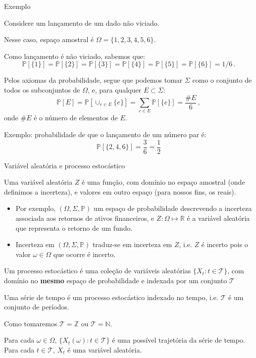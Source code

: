 \documentclass[11pt]{beamer}
\newenvironment{halfwideitemize}{\itemize\addtolength{\itemsep}{0.5em}}{\enditemize}
\begin{document}
	\begin{frame}{Exemplo}
		\begin{halfwideitemize}
			\item Considere um lançamento de um dado não viciado.
			\item Nesse caso, espaço amostral é $\Omega = \{1,2,3,4,5,6\}$.
			\item Como lançamento é não viciado, sabemos que:
			$$\mathbb{P}[\{1\}]= \mathbb{P}[\{2\}] = \mathbb{P}[\{3\}] = \mathbb{P}[\{4\}] = \mathbb{P}[\{5\}] = \mathbb{P}[\{6\}] = 1/6 \,.$$
			\item Pelos axiomas da probabilidade, segue que podemos tomar $\Sigma$ como o conjunto de todos os subconjuntos de $\Omega$, e, para qualquer $E\subset \Sigma$:
			$$\mathbb{P}[E]= \mathbb{P}[\cup_{e \in E}\{e\}] = \sum_{e \in E}\mathbb{P}[\{e\}] = \frac{\# E}{6}\, ,$$
			onde $\# E$ é o número de elementos de $E$.
			\item Exemplo: probabilidade de que o lançamento de um número par é:
			$$\mathbb{P}[\{2,4,6\}]= \frac{3}{6} = \frac{1}{2}$$
		\end{halfwideitemize}
	\end{frame}
	
	
	\begin{frame}{Variável aleatória e processo estocástico}
		\begin{halfwideitemize}
			\item Uma {\color{blue}variável aleatória} $Z$ é uma {\color{blue}função}, com domínio no espaço amostral (onde definimos a incerteza), e valores em outro espaço (para nossos fins, os reais).
			\begin{itemize}
				\item Por exemplo, $(\Omega, \Sigma, \mathbb{P})$ um espaço de probabilidade descrevendo a incerteza associada aos retornos de ativos financeiros, e $Z: \Omega \mapsto \mathbb{R}$ é a variável aleatória que representa o retorno de um fundo.
				\item Incerteza em $(\Omega, \Sigma, \mathbb{P})$ traduz-se em incerteza em $Z$, i.e. $Z$ é incerto pois o valor $\omega \in \Omega$ que ocorre é incerto.
			\end{itemize}
			\item Um {\color{blue} processo estocástico} é uma coleção de variáveis aleatórias $\{X_t: t \in \mathcal{T}\}$, com domínio no \textbf{mesmo} espaço de probabilidade e indexada por um conjunto $\mathcal{T}$
			\item Uma {\color{blue}série de tempo} é um processo estocástico indexado no tempo, i.e. $\mathcal{T}$ é um conjunto de períodos.
			\begin{halfwideitemize}
				\item Como  tomaremos $\mathcal{T} = \mathbb{Z}$ ou $\mathcal{T}  =\mathbb{N}$.
				\item Para cada $\omega \in \Omega$, $\{ X_t(\omega): t \in \mathcal{T} \}$ é uma possível trajetória da série de tempo. Para cada $t \in \mathcal{T}$, $X_t$ é uma variável aleatória.
			\end{halfwideitemize}
		\end{halfwideitemize}
	\end{frame}
	
\end{document}

